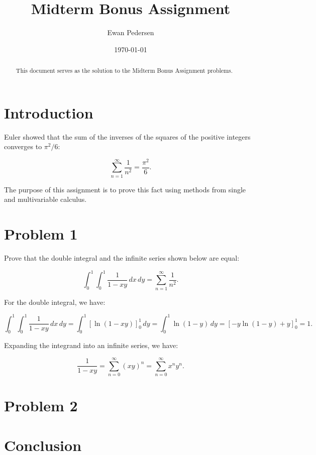\documentclass[12pt]{article}
\title{Midterm Bonus Assignment}
\author{Ewan Pedersen}
\date{\today}
\theoremstyle{definition}
\theoremstyle{remark}
\begin{document}
\maketitle

\begin{abstract}
  This document serves as the solution to the Midterm Bonus Assignment problems.
\end{abstract}

\section*{Introduction}

Euler showed that the sum of the inverses of the squares of the positive integers converges to $\pi^2/6$:

$$
\sum_{n=1}^\infty \frac{1}{n^2} = \frac{\pi^2}{6}.
$$

The purpose of this assignment is to prove this fact using methods from single and multivariable calculus.

\section*{Problem 1}

Prove that the double integral and the infinite series shown below are equal:

$$
\int_0^1 \int_0^1 \frac{1}{1 - xy} \, dx \, dy = \sum_{n=1}^\infty \frac{1}{n^2}.
$$

For the double integral, we have:

$$
\int_0^1 \int_0^1 \frac{1}{1 - xy} \, dx \, dy = \int_0^1 \left[ \ln(1 - xy) \right]_0^1 \, dy = \int_0^1 \ln(1 - y) \, dy = \left[ -y \ln(1 - y) + y \right]_0^1 = 1.
$$

Expanding the integrand into an infinite series, we have:

$$
\frac{1}{1 - xy} = \sum_{n=0}^\infty (xy)^n = \sum_{n=0}^\infty x^n y^n.
$$

\section*{Problem 2}

\section*{Conclusion}
\end{document}
